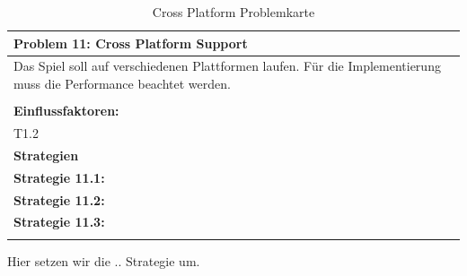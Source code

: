 \documentclass[fontsize=12pt,paper=a4,twoside]{scrartcl}
\begin{document}
\begin{table}[H]
    \centering
    \begin{tabular}{|p{15cm}|}
    \hline
          \textbf{Problem 11: Cross Platform Support}  \\ \hline
	Das Spiel soll auf verschiedenen Plattformen laufen. Für die Implementierung muss die Performance beachtet werden. \\
         \\ \hline
          \textbf{Einflussfaktoren: } \\
	T1.2 \\
          \hline
          \textbf{Strategien} \\ \hline
            {}          
           \label{strategie:11.1}     
          \textbf{Strategie 11.1:}  \\        
  {}          
           \label{strategie:11.2}              
          \textbf{Strategie 11.2:}  \\
	 {}          
           \label{strategie:11.3}     
          \textbf{Strategie 11.3: }  \\ 
	 \\ \hline
    \end{tabular}

    \caption{Cross Platform Problemkarte}
    \label{tab:ProblemKarte11}
\end{table}
Hier setzen wir die .. Strategie um. \\
\end{document}
